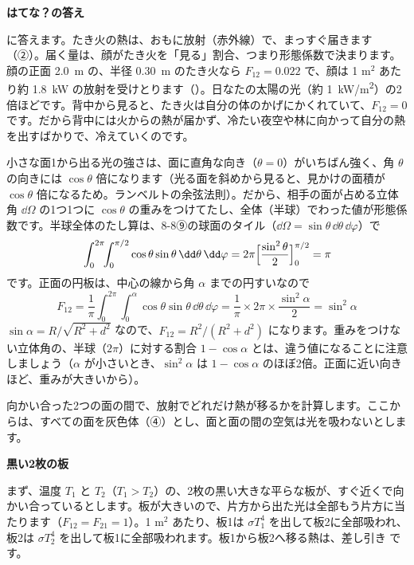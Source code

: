 \noindent\textbf{はてな？の答え}\par\nobreak
\label{ph:熱-13:hatena}\bkhatenaref に答えます。たき火の熱は、おもに放射（赤外線）で、まっすぐ届きます（②）。届く量は、顔がたき火を「見る」割合、つまり形態係数で決まります。顔の正面 \qty{2.0}{m} の、半径 \qty{0.30}{m} のたき火なら $F_{12}=0.022$ で、顔は 1 m$^2$ あたり約 \qty{1.8}{kW} の放射を受けとります（\nobreak{}\nobreak）。日なたの太陽の光（約 \qty{1}{kW/m^2}）の2倍ほどです。背中から見ると、たき火は自分の体のかげにかくれていて、$F_{12}=0$ です。だから背中には火からの熱が届かず、冷たい夜空や林に向かって自分の熱を出すばかりで、冷えていくのです。

\begin{motto}[5]
小さな面1から出る光の強さは、面に直角な向き（$\theta=0$）がいちばん強く、角 $\theta$ の向きには $\cos\theta$ 倍になります（光る面を斜めから見ると、見かけの面積が $\cos\theta$ 倍になるため。ランベルトの余弦法則）。だから、相手の面が占める立体角 $\dd\Omega$ の1つ1つに $\cos\theta$ の重みをつけてたし、全体（半球）でわった値が形態係数です。半球全体のたし算は、8-8⑨の球面のタイル（$\dd\Omega=\sin\theta\,\dd\theta\,\dd\varphi$）で
\[ \int_0^{2\pi}\!\!\int_0^{\pi/2}\cos\theta\sin\theta\,\dd\theta\,\dd\varphi=2\pi\Bigl[\frac{\sin^2\theta}{2}\Bigr]_0^{\pi/2}=\pi \]
です。正面の円板は、中心の線から角 $\alpha$ までの円すいなので
\[ F_{12}=\frac{1}{\pi}\int_0^{2\pi}\!\!\int_0^{\alpha}\cos\theta\sin\theta\,\dd\theta\,\dd\varphi=\frac{1}{\pi}\times2\pi\times\frac{\sin^2\alpha}{2}=\sin^2\alpha \]
$\sin\alpha=R/\sqrt{R^2+d^2}$ なので、$F_{12}=R^2/(R^2+d^2)$ になります。重みをつけない立体角の、半球（$2\pi$）に対する割合 $1-\cos\alpha$ とは、違う値になることに注意しましょう（$\alpha$ が小さいとき、$\sin^2\alpha$ は $1-\cos\alpha$ のほぼ2倍。正面に近い向きほど、重みが大きいから）。
\end{motto}

\phkokomade



\leavevmode\label{ph:熱-13:sec6}向かい合った2つの面の間で、放射でどれだけ熱が移るかを計算します。ここからは、すべての面を灰色体（④）とし、面と面の間の空気は光を吸わないとします。

\noindent\textbf{黒い2枚の板}\par\nobreak
まず、温度 $T_1$ と $T_2$（$T_1>T_2$）の、2枚の黒い大きな平らな板が、すぐ近くで向かい合っているとします。板が大きいので、片方から出た光は全部もう片方に当たります（$F_{12}=F_{21}=1$）。1 m$^2$ あたり、板1は $\sigma T_1^4$ を出して板2に全部吸われ、板2は $\sigma T_2^4$ を出して板1に全部吸われます。板1から板2へ移る熱は、差し引き
です。

